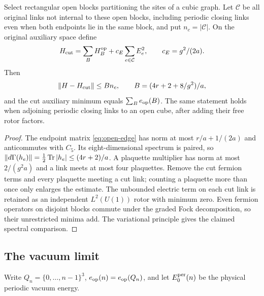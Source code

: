 \begin{lemma}
\label{lem:cut}
Select rectangular open blocks partitioning the sites of a cubic
graph. Let $\mathcal C$ be all original links not internal to
these open blocks, including periodic closing links even when
both endpoints lie in the same block, and put $n_c=|\mathcal C|$.
On the original auxiliary space define
\[
 H_{\rm cut}=\sum_B H_B^{\rm op}
                       +c_E\sum_{e\in\mathcal C}E_e^2,
 \qquad c_E=g^2/(2a).
\]
Then
\begin{equation}
 \|H-H_{\rm cut}\|\le Bn_c,\qquad
 B=(4r+2+8/g^2)/a,
 \label{eq:cut-bound}
\end{equation}
and the cut auxiliary minimum equals $\sum_B e_{\rm op}(B)$.
The same statement holds when adjoining periodic closing links
to an open cube, after adding their free rotor factors.
\end{lemma}
\begin{proof}
The endpoint matrix \eqref{eq:open-edge} has norm at most
$r/a+1/(2a)$ and anticommutes with $C_5$. Its eight-dimensional
spectrum is paired, so
$\|d\Gamma(h_e)\|=\frac12\operatorname{Tr}|h_e|\le(4r+2)/a$.
A plaquette multiplier has norm at most $2/(g^2a)$ and a link
meets at most four plaquettes. Remove the cut fermion terms and
every plaquette meeting a cut link; counting a plaquette more
than once only enlarges the estimate.
The unbounded electric term on each cut link is retained as an
independent $L^2(U(1))$ rotor with minimum zero.
Even fermion operators on disjoint blocks commute under the graded
Fock decomposition, so their unrestricted minima add.
The variational principle gives the claimed spectral comparison.
\end{proof}

\subsection{The vacuum limit}

Write $Q_n=\{0,\ldots,n-1\}^3$, $e_{\rm op}(n)=e_{\rm op}(Q_n)$,
and let $E_0^{\rm per}(n)$ be the physical periodic vacuum energy.

